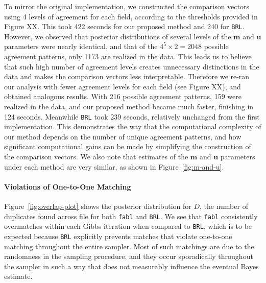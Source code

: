 \documentclass[12pt,letterpaper]{article}
\newcommand{\1}[1]{\mathbb{I}\!\left[#1\right]} %
\begin{document}
To mirror the original implementation, we constructed the comparison
vectors using 4 levels of agreement for each field, according to the
thresholds provided in Figure XX. This took 422 seconds for our proposed
method and 240 for \texttt{BRL}. However, we observed that posterior
distributions of several levels of the \(\mathbf{m}\) and \(\mathbf{u}\)
parameters were nearly identical, and that of the
\(4^5 \times 2 = 2048\) possible agreement patterns, only 1173 are
realized in the data. This leads us to believe that such high number of
agreement levels creates unnecessary distinctions in the data and makes
the comparison vectors less interpretable. Therefore we re-ran our
analysis with fewer agreement levels for each field (see Figure XX), and
obtained analogous results. With 216 possible agreement patterns, 159
were realized in the data, and our proposed method became much faster,
finishing in 124 seconds. Meanwhile \texttt{BRL} took 239 seconds,
relatively unchanged from the first implementation. This demonstrates
the way that the computational complexity of our method depends on the
number of unique agreement patterns, and how significant computational
gains can be made by simplifying the construction of the comparison
vectors. We also note that estimates of the \(\mathbf{m}\) and
\(\mathbf{u}\) parameters under each method are very similar, as shown in
Figure~\ref{fig:m-and-u}.

\paragraph{Violations of One-to-One Matching} Figure~\ref{fig:overlap-plot} shows the posterior distribution for \(D\), the number of
duplicates found across file for both \texttt{fabl} and \texttt{BRL}. We
see that \texttt{fabl} consistently overmatches within each Gibbs
iteration when compared to \texttt{BRL}, which is to be expected because
\texttt{BRL} explicitly prevents matches that violate one-to-one
matching throughout the entire sampler. Most of such matchings are due
to the randomness in the sampling procedure, and they occur sporadically
throughout the sampler in such a way that does not measurably influence
the eventual Bayes estimate.
\end{document}
